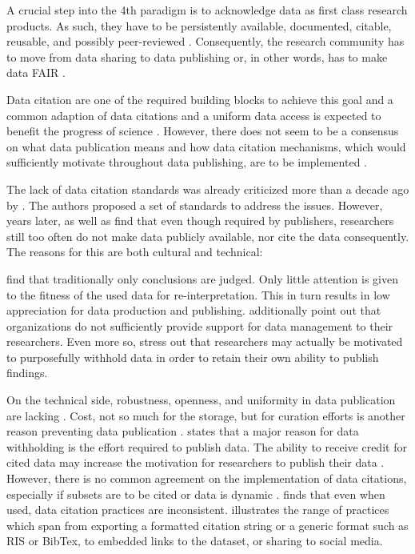 \documentclass[letterpaper, parskip=half]{scrartcl}
\begin{document}
A crucial step into the 4th paradigm is to acknowledge data as first class research products. As such, they have to be persistently available, documented, citable, reusable, and possibly peer-reviewed \citep{Callaghan2012, Kratz2014}. Consequently, the research community has to move from data sharing to data publishing \citep{Costello2009, Kratz2014} or, in other words, has to make data \gls{FAIR} \citep{Wilkinson2016}. 

Data citation are one of the required building blocks to achieve this goal and a common adaption of data citations and a uniform data access is expected to benefit the progress of science \citep{CODATA2013}. However, there does not seem to be a consensus on what data publication means \citep{Kratz2014} and how data citation mechanisms, which would sufficiently motivate throughout data publishing, are to be implemented \citep{Costello2009}.

The lack of data citation standards was already criticized more than a decade ago by \cite{AltKin07}. The authors proposed a set of standards to address the issues. However, years later, \cite{Altman2015} as well as \cite{Tenopir2011} find that even though required by publishers, researchers still too often do not make data publicly available, nor cite the data consequently. The reasons for this are both cultural and technical: 

\cite{Lawrence2011} find that traditionally only conclusions are judged. Only little attention is given to the fitness of the used data for re-interpretation. This in turn results in low appreciation for data production and publishing. \cite{Tenopir2011} additionally point out that organizations do not sufficiently provide support for data management to their researchers. Even more so, \cite{Tenopir2011} stress out that researchers may actually be motivated to purposefully withhold data in order to retain their own ability to publish findings.

On the technical side, robustness, openness, and uniformity in data publication are lacking \citep{Starr2015, Koltay2016}. Cost, not so much for the storage, but for curation efforts is another reason preventing data publication \citep{Gray2002}.
\citep{Tenopir2011} states that a major reason for data withholding is the effort required to publish data. 
The ability to receive credit for cited data may increase the motivation for researchers to publish their data \citep{Crosas2011, AltKin07}. However, there is no common agreement on the implementation of data citations, especially if subsets are to be cited or data is dynamic \citep{Kratz2014, Assante2016}. \cite{Belter2014} finds that even when used, data citation practices are inconsistent. \cite{Assante2016} illustrates the range of practices which span from exporting a formatted citation string or a generic format such as RIS or BibTex, to embedded links to the dataset, or sharing to social media. 
\end{document}
